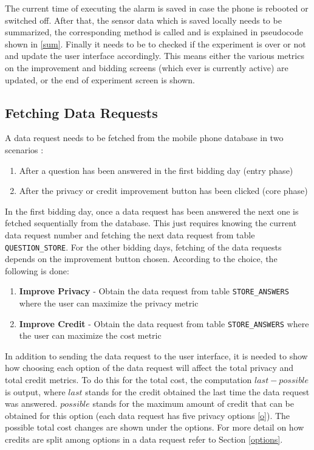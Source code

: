 The current time of executing the alarm is saved in case the phone is rebooted or switched off. After that, the sensor data which is saved locally
needs to be summarized, the corresponding method is called and is explained in pseudocode shown in \ref{sum}. Finally it needs to be to checked if the experiment is over or not and update the user interface accordingly. This means either the various metrics on the improvement and bidding screens (which ever is currently active) are updated, or
the end of experiment screen is shown.

\subsection{Fetching Data Requests} \label{data_req}
A data request needs to be fetched from the mobile phone database in two scenarios :

\begin{enumerate}
	\item After a question has been answered in the first bidding day (entry phase)
	\item After the privacy or credit improvement button has been clicked (core phase)
\end{enumerate}

In the first bidding day, once a data request has been answered the next one is fetched sequentially from the database. This just requires knowing the current data request number and fetching the next data request from table \texttt{QUESTION\_STORE}. For the other bidding days, fetching of the data requests depends on the improvement button chosen. According to the choice, the following is done:

\begin{enumerate}
	\item \textbf{Improve Privacy} - Obtain the data request from table \texttt{STORE\_ANSWERS} where the user can maximize the privacy metric
	\item \textbf{Improve Credit} - Obtain the data request from table \texttt{STORE\_ANSWERS} where the user can maximize the cost metric
\end{enumerate}

In addition to sending the data request to the user interface, it is needed to show how choosing each option of the data request will affect the total privacy and total credit metrics. To do this for the total cost, the computation $last-possible$ is output, where $last$ stands for the credit obtained the last time the data request was answered. $possible$ stands for the maximum amount of credit that can be obtained for this option (each data request has five privacy options \ref{o}). The possible total cost changes are shown under the options. For more detail on how credits are split among options in a data request refer to Section \ref{options}.

